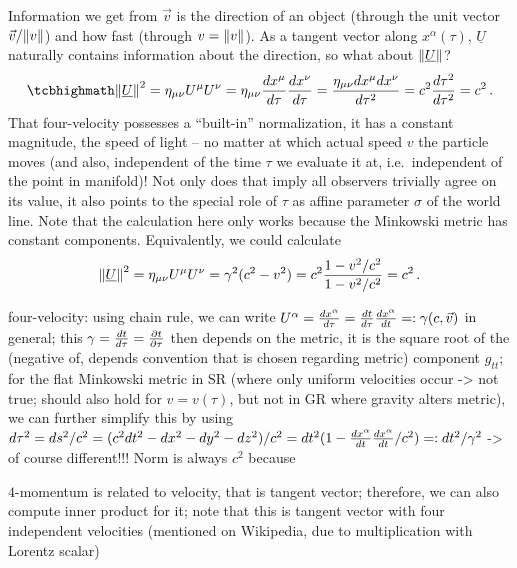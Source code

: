 Information we get from $\vec{v}$ is the direction of an object (through the unit vector $\vec{v} / \norm{v}$) and how fast (through $v = \norm{v}$). As a tangent vector along $x^\alpha(\tau)$, $\underline{U}$ naturally contains information about the direction, so what about $\norm{\underline{U}}$?
\begin{equation}
	\eqbox{
	\norm{\underline{U}}^2 = \eta_{\mu \nu} U^\mu U^\nu = \eta_{\mu \nu} \dv{x^\mu}{\tau} \dv{x^\nu}{\tau} = \frac{\eta_{\mu \nu} dx^\mu dx^\nu}{d\tau^2} = c^2 \frac{d\tau^2}{d\tau^2} = c^2
	} \, .
\end{equation}
That four-velocity possesses a \enquote{built-in} normalization, it has a constant magnitude, the speed of light -- no matter at which actual speed $v$ the particle moves (and also, independent of the time $\tau$ we evaluate it at, i.e.~independent of the point in manifold)! Not only does that imply all observers trivially agree on its value, it also points to the special role of $\tau$ as affine parameter $\sigma$ of the world line. Note that the calculation here only works because the Minkowski metric has constant components. Equivalently, we could calculate
\begin{equation*}
	\norm{\underline{U}}^2 = \eta_{\mu \nu} U^\mu U^\nu = \gamma^2 (c^2 - v^2) = c^2 \frac{1 - v^2 / c^2}{1 - v^2 / c^2} = c^2 \, .
\end{equation*}






four-velocity: using chain rule, we can write $U^\alpha = \dv{x^\alpha}{\tau} = \dv{t}{\tau} \dv{x^\alpha}{t} =: \gamma (c, \vec{v})$ in general; this $\gamma = \dv{t}{\tau} = \pdv{t}{\tau}$ then depends on the metric, it is the square root of the (negative of, depends convention that is chosen regarding metric) component $g_{tt}$; for the flat Minkowski metric in SR (where only uniform velocities occur -> not true; should also hold for $v = v(\tau)$, but not in GR where gravity alters metric), we can further simplify this by using $d\tau^2 = ds^2 / c^2 = (c^2 dt^2 - dx^2 - dy^2 - dz^2) / c^2 = dt^2 (1 - \dv{x^\alpha}{t} \dv{x^\alpha}{t} / c^2) =: dt^2 / \gamma^2$ -> of course different!!! Norm is always $c^2$ because 



$4$-momentum is related to velocity, that is tangent vector; therefore, we can also compute inner product for it; note that this is tangent vector with four independent velocities (mentioned on Wikipedia, due to multiplication with Lorentz scalar)



